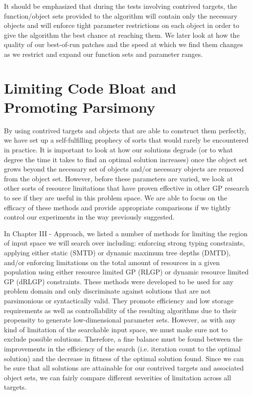\documentclass[12pt]{report} 	%
\numberwithin{figure}{chapter}
\numberwithin{table}{chapter}
\numberwithin{equation}{chapter}
\begin{document}
\begin{flushleft}
It should be emphasized that during the tests involving contrived targets, the function/object sets provided to the algorithm will contain only the necessary objects and will enforce tight parameter restrictions on each object in order to give the algorithm the best chance at reaching them. We later look at how the quality of our best-of-run patches and the speed at which we find them changes as we restrict and expand our function sets and parameter ranges.
\clearpage
\section{Limiting Code Bloat and Promoting Parsimony}
By using contrived targets and objects that are able to construct them perfectly, we have set up a self-fulfilling prophecy of sorts that would rarely be encountered in practice. It is important to look at how our solutions degrade (or to what degree the time it takes to find an optimal solution increases) once the object set grows beyond the necessary set of objects and/or necessary objects are removed from the object set. However, before these parameters are varied, we look at other sorts of resource limitations that have proven effective in other GP research to see if they are useful in this problem space. We are able to focus on the efficacy of these methods and provide appropriate comparisons if we tightly control our experiments in the way previously suggested.

In Chapter III - Approach, we listed a number of methods for limiting the region of input space we will search over including: enforcing strong typing constraints, applying either static (SMTD) or dynamic maximum tree depths (DMTD), and/or enforcing limitations on the total amount of resources in a given population using either resource limited GP (RLGP) or dynamic resource limited GP (dRLGP) constraints. These methods were developed to be used for any problem domain and only discriminate against solutions that are not parsimonious or syntactically valid. They promote efficiency and low storage requirements as well as controllability of the resulting algorithms due to their propensity to generate low-dimensional parameter sets. However, as with any kind of limitation of the searchable input space, we must make sure not to exclude possible solutions. Therefore, a fine balance must be found between the improvements in the efficiency of the search (i.e. iteration count to the optimal solution) and the decrease in fitness of the optimal solution found. Since we can be sure that all solutions are attainable for our contrived targets and associated object sets, we can fairly compare different severities of limitation across all targets.


\end{flushleft}
\end{document}
